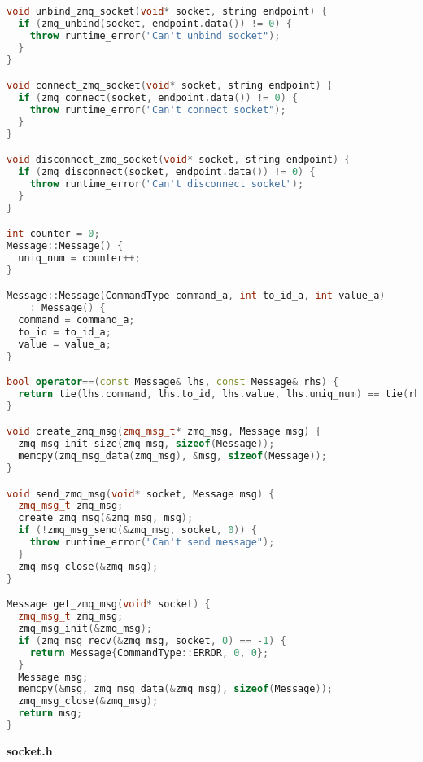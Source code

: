 \begin{lstlisting}[language=C++]
void unbind_zmq_socket(void* socket, string endpoint) {
  if (zmq_unbind(socket, endpoint.data()) != 0) {
    throw runtime_error("Can't unbind socket");
  }
}

void connect_zmq_socket(void* socket, string endpoint) {
  if (zmq_connect(socket, endpoint.data()) != 0) {
    throw runtime_error("Can't connect socket");
  }
}

void disconnect_zmq_socket(void* socket, string endpoint) {
  if (zmq_disconnect(socket, endpoint.data()) != 0) {
    throw runtime_error("Can't disconnect socket");
  }
}

int counter = 0;
Message::Message() {
  uniq_num = counter++;
}

Message::Message(CommandType command_a, int to_id_a, int value_a)
    : Message() {
  command = command_a;
  to_id = to_id_a;
  value = value_a;
}

bool operator==(const Message& lhs, const Message& rhs) {
  return tie(lhs.command, lhs.to_id, lhs.value, lhs.uniq_num) == tie(rhs.command, rhs.to_id, rhs.value, rhs.uniq_num);
}

void create_zmq_msg(zmq_msg_t* zmq_msg, Message msg) {
  zmq_msg_init_size(zmq_msg, sizeof(Message));
  memcpy(zmq_msg_data(zmq_msg), &msg, sizeof(Message));
}

void send_zmq_msg(void* socket, Message msg) {
  zmq_msg_t zmq_msg;
  create_zmq_msg(&zmq_msg, msg);
  if (!zmq_msg_send(&zmq_msg, socket, 0)) {
    throw runtime_error("Can't send message");
  }
  zmq_msg_close(&zmq_msg);
}

Message get_zmq_msg(void* socket) {
  zmq_msg_t zmq_msg;
  zmq_msg_init(&zmq_msg);
  if (zmq_msg_recv(&zmq_msg, socket, 0) == -1) {
    return Message{CommandType::ERROR, 0, 0};
  }
  Message msg;
  memcpy(&msg, zmq_msg_data(&zmq_msg), sizeof(Message));
  zmq_msg_close(&zmq_msg);
  return msg;
}

\end{lstlisting}

\textbf{socket.h}

